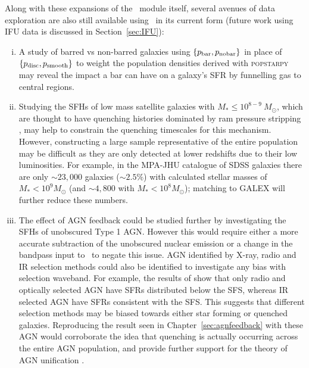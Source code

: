 Along with these expansions of the \starpy\ module itself, several avenues of data exploration are also still available using \starpy\ in its current form (future work using IFU data is discussed in Section~\ref{sec:IFU}):
\begin{enumerate}[(i)]

\item A study of barred vs non-barred galaxies using $\{p_{\rm{bar}}, p_{\rm{no bar}}\}$ in place of $\{p_{\rm{disc}}, p_{\rm{smooth}}\}$ to weight the population densities derived with \textsc{popstarpy} may reveal the impact a bar can have on a galaxy's SFR by funnelling gas to central regions.

\item Studying the SFHs of low mass satellite galaxies with $M_* \leq 10^{8-9} ~M_{\odot}$, which are thought to have quenching histories dominated by ram pressure stripping \citep{hester06, fillingham16}, may help to constrain the quenching timescales for this mechanism. However, constructing a large sample representative of the entire population may be difficult as they are only detected at lower redshifts due to their low luminosities. For example, in the MPA-JHU catalogue of SDSS galaxies there are only $\sim23,000$ galaxies ($\sim2.5\%$) with calculated stellar masses of $M_* < 10^9 M_{\odot}$ (and $\sim4,800$ with $M_* < 10^8 M_{\odot}$); matching to GALEX will further reduce these numbers. 

\item The effect of AGN feedback could be studied further by investigating the SFHs of unobscured Type 1 AGN. However this would require either a more accurate subtraction of the unobscured nuclear emission or a change in the bandpass input to \starpy\ to negate this issue. AGN identified by X-ray, radio and IR selection methods could also be identified to investigate any bias with selection waveband. For example, the results of \cite{ellison16} show that only radio and optically selected AGN have SFRs distributed below the SFS, whereas IR selected AGN have SFRs consistent with the SFS. This suggests that different selection methods may be biased towards either star forming or quenched galaxies. Reproducing the result seen in Chapter~\ref{sec:agnfeedback} with these AGN would corroborate the idea that quenching is actually occurring across the entire AGN population, and provide further support for the theory of AGN unification \citep{antonucci93, urry95}.

\end{enumerate}

